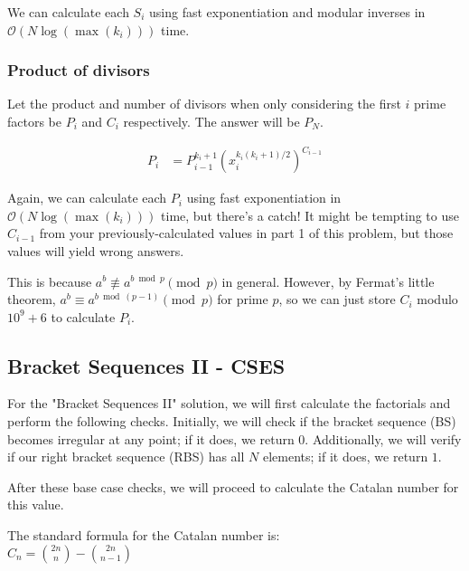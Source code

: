                 We can calculate each $S_i$ using fast exponentiation and modular inverses in
            $\mathcal O(N \log(\max(k_i)))$ time.
            
            \subsubsection{Product of divisors}

                Let the product and number of divisors when only considering the first $i$ prime
                factors be $P_i$ and $C_i$ respectively. The answer will be $P_N$.
                
                $$\begin{aligned} P_i &= P_{i - 1}^{k_i + 1} \left(x_i^{k_i(k_i + 1)/2} \right)^{C_{i - 1}} \end{aligned}$$
                
                Again, we can calculate each $P_i$ using fast exponentiation in
                $\mathcal O(N \log(\max(k_i)))$ time, but there's a catch! It might be tempting
                to use $C_{i - 1}$ from your previously-calculated values in part 1 of this
                problem, but those values will yield wrong answers.
                
                This is because $a^b \not \equiv a^{b \bmod p} \pmod{p}$ in general. However, by
                Fermat's little theorem, $a^b \equiv a^{b \bmod (p - 1)} \pmod{p}$ for prime
                $p$, so we can just store $C_i$ modulo $10^9 + 6$ to calculate $P_i$.

        \subsection{Bracket Sequences II - CSES}
            For the "Bracket Sequences II" solution, we will first calculate the factorials and perform the following checks. Initially, we will check if the bracket sequence (BS) becomes irregular at any point; if it does, we return $0$. Additionally, we will verify if our right bracket sequence (RBS) has all $N$ elements; if it does, we return $1$.

            After these base case checks, we will proceed to calculate the Catalan number for this value.
 
            The standard formula for the Catalan number is: \\

            $C_n = \binom{2n}{n} - \binom{2n}{n - 1}$

